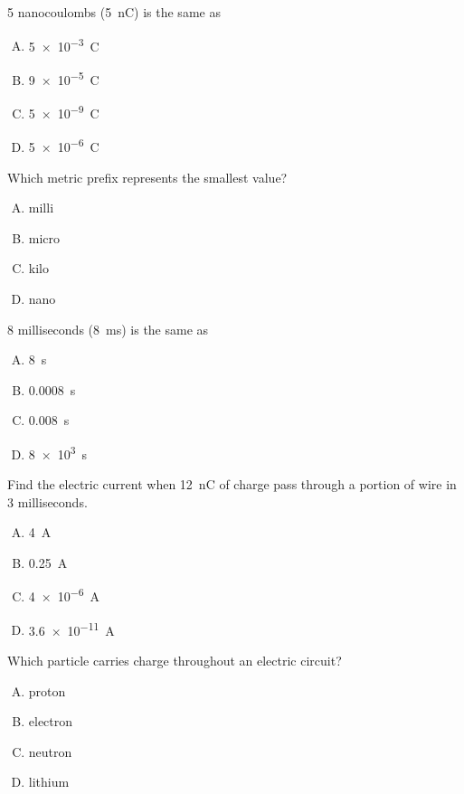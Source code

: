\documentclass[14pt,t,dvipsnames]{beamer}
\begin{document}
\begin{frame}
5 nanocoulombs (\SI{5}{nC}) is the same as

\begin{enumerate}[A.]
    \item \SI{5e-3}{C}
    \item \SI{9e-5}{C}
    \item \alert<2->{\SI{5e-9}{C}}
    \item \SI{5e-6}{C}
\end{enumerate}
\end{frame}

\begin{frame}
Which metric prefix represents the smallest value?

\begin{enumerate}[A.]
    \item milli
    \item micro
    \item kilo
    \item \alert<2->{nano}
\end{enumerate}
\end{frame}

\begin{frame}
8 milliseconds (\SI{8}{ms}) is the same as

\begin{enumerate}[A.]
    \item \SI{8}{s}
    \item \SI{0.0008}{s}
    \item \alert<2->{\SI{0.008}{s}}
    \item \SI{8e3}{s}
\end{enumerate}
\end{frame}

\begin{frame}
Find the electric current when \SI{12}{nC} of charge pass through a portion of wire in 3 milliseconds.

\begin{enumerate}[A.]
    \item \SI{4}{A}
    \item \SI{0.25}{A}
    \item \alert<2->{\SI{4e-6}{A}}
    \item \SI{3.6e-11}{A}
\end{enumerate}
\end{frame}



\begin{frame}
Which particle carries charge throughout an electric circuit?

\begin{enumerate}[A.]
    \item proton
    \item \alert<2->{electron}
    \item neutron
    \item lithium
\end{enumerate}
\end{frame}
\end{document}
